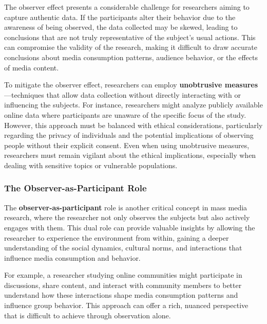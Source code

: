 \documentclass[
]{book}
\begin{document}
The observer effect presents a considerable challenge for researchers aiming to capture authentic data. If the participants alter their behavior due to the awareness of being observed, the data collected may be skewed, leading to conclusions that are not truly representative of the subject's usual actions. This can compromise the validity of the research, making it difficult to draw accurate conclusions about media consumption patterns, audience behavior, or the effects of media content.

To mitigate the observer effect, researchers can employ \textbf{unobtrusive measures}---techniques that allow data collection without directly interacting with or influencing the subjects. For instance, researchers might analyze publicly available online data where participants are unaware of the specific focus of the study. However, this approach must be balanced with ethical considerations, particularly regarding the privacy of individuals and the potential implications of observing people without their explicit consent. Even when using unobtrusive measures, researchers must remain vigilant about the ethical implications, especially when dealing with sensitive topics or vulnerable populations.

\subsubsection*{The Observer-as-Participant Role}\label{the-observer-as-participant-role}

The \textbf{observer-as-participant} role is another critical concept in mass media research, where the researcher not only observes the subjects but also actively engages with them. This dual role can provide valuable insights by allowing the researcher to experience the environment from within, gaining a deeper understanding of the social dynamics, cultural norms, and interactions that influence media consumption and behavior.

For example, a researcher studying online communities might participate in discussions, share content, and interact with community members to better understand how these interactions shape media consumption patterns and influence group behavior. This approach can offer a rich, nuanced perspective that is difficult to achieve through observation alone.
\end{document}

